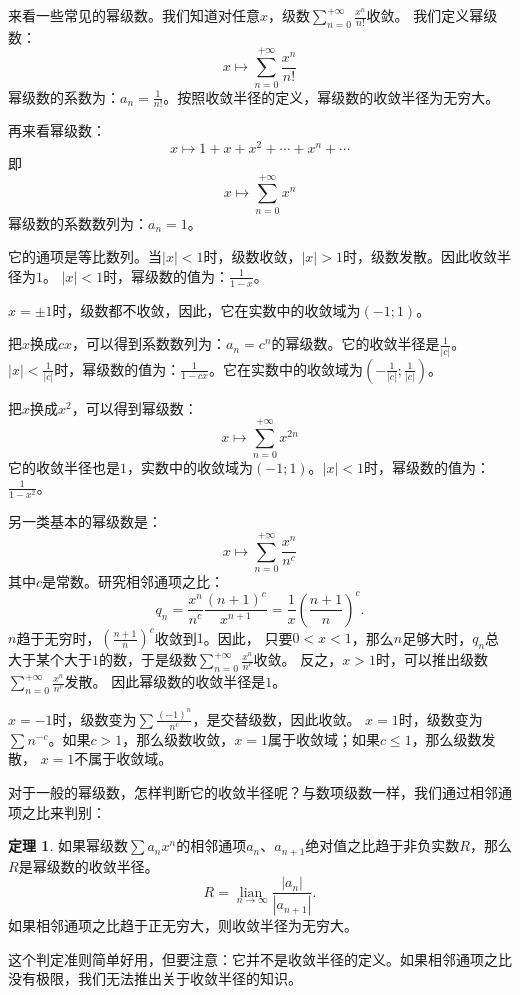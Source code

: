 \documentclass[12pt,UTF8]{ctexbook}
\newcommand{\lian}[1]{
    \underset{#1}{\operatorname{lian}\,}
}
\newcommand{\qu}[2]{\displaystyle\left(#1;#2\right)}
\theoremstyle{definition}
\newtheorem{tm}{定理}[section]
\theoremstyle{plain}
\begin{document}
来看一些常见的幂级数。我们知道对任意$x$，级数$\sum_{n=0}^{+\infty} \frac{x^n}{n!}$收敛。
我们定义幂级数：
$$ x \mapsto \sum_{n=0}^{+\infty} \frac{x^n}{n!} $$
幂级数的系数为：$a_n = \frac{1}{n!}$。按照收敛半径的定义，幂级数的收敛半径为无穷大。

再来看幂级数：
$$ x \mapsto 1 + x + x^2 + \cdots + x^n + \cdots $$
即
$$ x \mapsto \sum_{n=0}^{+\infty} x^n $$
幂级数的系数数列为：$a_n = 1$。

它的通项是等比数列。当$|x|<1$时，级数收敛，$|x|>1$时，级数发散。因此收敛半径为$1$。
$|x|<1$时，幂级数的值为：$\frac{1}{1 - x}$。

$x = \pm 1$时，级数都不收敛，因此，它在实数中的收敛域为$(-1;1)$。

把$x$换成$cx$，可以得到系数数列为：$a_n = c^n$的幂级数。它的收敛半径是$\frac{1}{|c|}$。
$|x|<\frac{1}{|c|}$时，幂级数的值为：$\frac{1}{1 - cx}$。它在实数中的收敛域为$\qu{-\frac{1}{|c|}}{\frac{1}{|c|}}$。

把$x$换成$x^2$，可以得到幂级数：
$$ x \mapsto \sum_{n=0}^{+\infty} x^{2n} $$
它的收敛半径也是$1$，实数中的收敛域为$(-1;1)$。$|x|<1$时，幂级数的值为：$\frac{1}{1 - x^2}$。

另一类基本的幂级数是：
$$ x \mapsto \sum_{n=0}^{+\infty} \frac{x^n}{n^c}$$
其中$c$是常数。研究相邻通项之比：
$$ q_n = \frac{x^n}{n^c} \frac{(n+1)^c}{x^{n+1}} = \frac{1}{x} \left(\frac{n+1}{n}\right)^c. $$
$n$趋于无穷时，$\displaystyle \left(\frac{n+1}{n}\right)^c$收敛到$1$。因此，
只要$0<x<1$，那么$n$足够大时，$q_n$总大于某个大于$1$的数，于是级数$\sum_{n=0}^{+\infty} \frac{x^n}{n^c}$收敛。
反之，$x>1$时，可以推出级数$\sum_{n=0}^{+\infty} \frac{x^n}{n^c}$发散。
因此幂级数的收敛半径是$1$。

$x=-1$时，级数变为$\sum \frac{(-1)^n}{n^c}$，是交替级数，因此收敛。
$x=1$时，级数变为$\sum n^{-c}$。如果$c>1$，那么级数收敛，$x=1$属于收敛域；如果$c\leqslant 1$，那么级数发散，
$x=1$不属于收敛域。

对于一般的幂级数，怎样判断它的收敛半径呢？与数项级数一样，我们通过相邻通项之比来判别：

\begin{tm}
    如果幂级数$\sum a_n x^n$的相邻通项$a_n$、$a_{n+1}$绝对值之比趋于非负实数$R$，那么$R$是幂级数的收敛半径。
    $$ R = \lian{n\to\infty} \frac{|a_n|}{|a_{n+1}|}. $$
    如果相邻通项之比趋于正无穷大，则收敛半径为无穷大。
\end{tm}

这个判定准则简单好用，但要注意：它并不是收敛半径的定义。如果相邻通项之比没有极限，我们无法推出关于收敛半径的知识。
\end{document}
